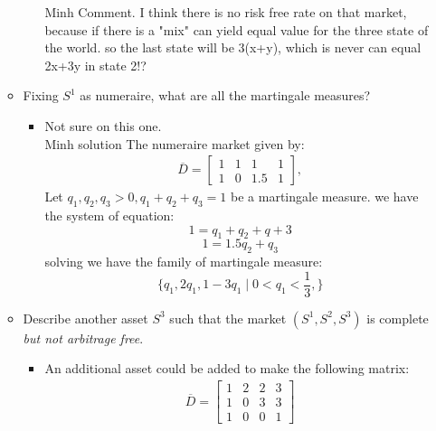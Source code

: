 \documentclass[12pt]{article}
\newcommand{\ol}{\overline}
\begin{document}
\begin{enumerate}
\begin{itemize}
\begin{itemize}
            Minh Comment. I think there is no risk free rate on that market, because if there is a "mix" can yield equal value for the three state of the world. so the last state will be 3(x+y), which is never can equal 2x+3y in state 2!?
        \end{itemize}
        \item Fixing $S^1$ as numeraire, what are all the martingale measures?
        \begin{itemize}
            \item Not sure on this one.\\
           Minh solution
            The numeraire market given by:\\
             \begin{align*}
    \ol{D}=
    \left[\begin{array}{llll}
    1 & 1 & 1 & 1\\
    1 & 0 & 1.5 & 1
    \end{array}
    \right],
    \end{align*}
    Let $q_1,q_2,q_3 >0, q_1 + q_2 +q_3 =1$ be a martingale measure.
    we have the system of equation:
    $$1=q_1+q_2+q+3$$
    $$1=1.5q_2+q_3$$
    solving we have the family of martingale measure:
    $$\{q_1,2q_1,1-3q_1\mid 0<q_1<\frac{1}{3},\}$$
    
    
    
    
   
          
        \end{itemize}
        \item Describe another asset $S^3$ such that the market $(S^1, S^2, S^3)$ is complete
        \emph{but not arbitrage free}.
        \begin{itemize}
            \item         An additional asset could be added to make the following matrix:
            \begin{align*}
    \ol{D}=
    \left[\begin{array}{llll}
    1 & 2 & 2 & 3\\
    1 & 0 & 3 & 3 \\
    1 & 0 & 0 & 1
    \end{array}
    \right]
    \end{align*}
        \end{itemize}


\end{itemize}
\end{enumerate}
\end{document}

